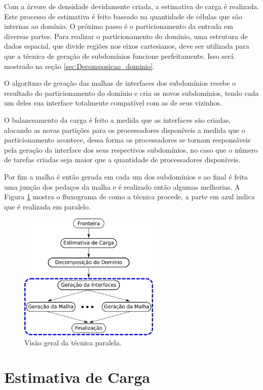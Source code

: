Com a árvore de densidade devidamente criada, a estimativa de carga é realizada. Este processo de estimativa é feito baseado na quantidade de células que são internas ao domínio. O próximo passo é o particionamento da entrada em diversas partes. Para realizar o particionamento do domínio, uma estrutura de dados espacial, que divide regiões nos eixos cartesianos, deve ser utilizada para que a técnica de geração de subdomínios funcione perfeitamente. Isso será mostrado na seção \ref{sec:Decomposicao_dominio}.

O algoritmo de geração das malhas de interfaces dos subdomínios recebe o resultado do particionamento do domínio e cria os novos subdomínios, tendo cada um deles sua interface totalmente compatível com as de seus vizinhos.

O balanceamento da carga é feito a medida que as interfaces são criadas, alocando as novas partições para os processadores disponíveis a medida que o particionamento acontece, dessa forma os processadores se tornam responsáveis pela geração da interface dos seus respectivos subdomínios, no caso que o número de tarefas criadas seja maior que a quantidade de processadores disponíveis. 

Por fim a malha é então gerada em cada um dos subdomínios e ao final é feita uma junção dos pedaços da malha e é realizado então algumas melhorias. A Figura \ref{fig:fluxograma} mostra o fluxograma de como a técnica procede, a parte em azul indica que é realizada em paralelo.

\begin{figure}[!ht]
	\centering
	\includegraphics[width=0.6\textwidth]{fig/fluxograma.png}
	\caption{Visão geral da técnica paralela.}
	\label{fig:fluxograma}
\end{figure}


\section{Estimativa de Carga} 
\label{sec:Estimativa_de_Carga}

